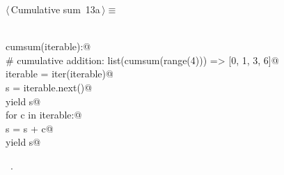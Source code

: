 \documentclass[11pt,oneside]{article}	%
\begin{document}
\begin{flushleft} \small
\begin{minipage}{\linewidth} \label{scrap18}
\protect{}$\langle\,$Cumulative sum\nobreak\ {\footnotesize 13a}$\,\rangle\equiv$
\vspace{-1ex}
\begin{list}{}{} \item
\mbox{}\verb@@\\
\mbox{}\verb@def cumsum(iterable):@\\
\mbox{}\verb@    # cumulative addition: list(cumsum(range(4))) => [0, 1, 3, 6]@\\
\mbox{}\verb@    iterable = iter(iterable)@\\
\mbox{}\verb@    s = iterable.next()@\\
\mbox{}\verb@    yield s@\\
\mbox{}\verb@    for c in iterable:@\\
\mbox{}\verb@        s = s + c@\\
\mbox{}\verb@        yield s@\\
\mbox{}\verb@@{\NWsep}
\end{list}
\vspace{-1ex}
\footnotesize\addtolength{\baselineskip}{-1ex}
\begin{list}{}{\setlength{\itemsep}{-\parsep}\setlength{\itemindent}{-\leftmargin}}
\item \NWtxtMacroRefIn\ .
\end{list}
\end{minipage}\\[4ex]
\end{flushleft}
\end{document}
